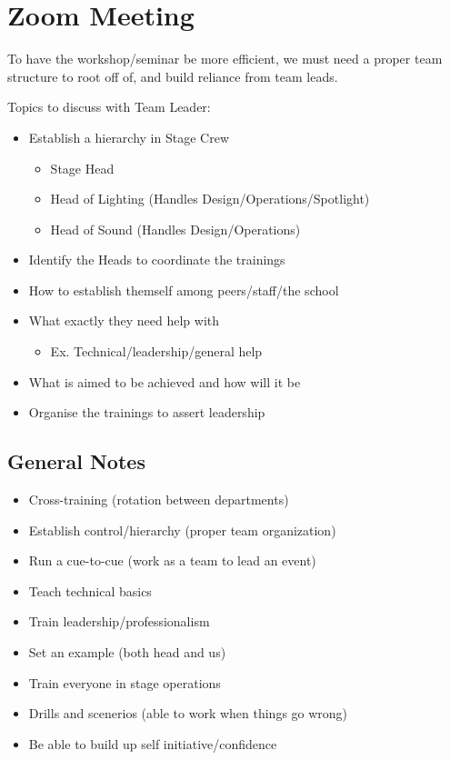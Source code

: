 \section{Zoom Meeting}
\par To have the workshop/seminar be more efficient, we must need a proper team structure 
to root off of, and build reliance from team leads. 
\\
\par \noindent Topics to discuss with Team Leader:
\begin{itemize}
    \item Establish a hierarchy in Stage Crew 
    \begin{itemize}
        \item Stage Head 
        \item Head of Lighting (Handles Design/Operations/Spotlight)
        \item Head of Sound (Handles Design/Operations)
    \end{itemize}
    \item Identify the Heads to coordinate the trainings 
    \item How to establish themself among peers/staff/the school
    \item What exactly they need help with
    \begin{itemize}
        \item Ex. Technical/leadership/general help
    \end{itemize}
    \item What is aimed to be achieved and how will it be 
    \item Organise the trainings to assert leadership
\end{itemize}

\subsection{General Notes}
\begin{itemize}
    \item Cross-training (rotation between departments)
    \item Establish control/hierarchy (proper team organization)
    \item Run a cue-to-cue (work as a team to lead an event)
    \item Teach technical basics 
    \item Train leadership/professionalism
    \item Set an example (both head and us)
    \item Train everyone in stage operations 
    \item Drills and scenerios (able to work when things go wrong)
    \item Be able to build up self initiative/confidence 
\end{itemize}